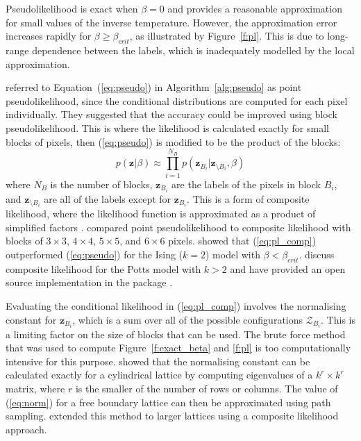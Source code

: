 \documentclass[nojss,shortnames]{jss}\usepackage[]{graphicx}\usepackage[]{color}
\begin{document}
Pseudolikelihood is exact when $\beta=0$ and provides a reasonable approximation for small values of the inverse temperature. However, the approximation error increases rapidly for $\beta \ge \beta_{crit}$, as illustrated by Figure~\ref{f:pl}. This is due to long-range dependence between the labels, which is inadequately modelled by the local approximation.

\citet{Ryden1998} referred to Equation~(\ref{eq:pseudo}) in Algorithm~\ref{alg:pseudo} as point pseudolikelihood, since the conditional distributions are computed for each pixel individually. They suggested that the accuracy could be improved using block pseudolikelihood. This is where the likelihood is calculated exactly for small blocks of pixels, then (\ref{eq:pseudo}) is modified to be the product of the blocks:
\begin{equation}
p(\mathbf{z}|\beta) \approx \prod_{i=1}^{N_B} p(\mathbf{z}_{B_i} | \mathbf{z}_{\setminus B_i}, \beta)
\label{eq:pl_comp}
\end{equation}
where $N_B$ is the number of blocks, $\mathbf{z}_{B_i}$ are the labels of the pixels in block $B_i$, and $\mathbf{z}_{\setminus B_i}$ are all of the labels except for $\mathbf{z}_{B_i}$. This is a form of composite likelihood, where the likelihood function is approximated as a product of simplified factors \citep{Varin2011}. \citet{Friel2012} compared point pseudolikelihood to composite likelihood with blocks of $3 \times 3$, $4 \times 4$, $5 \times 5$, and $6 \times 6$ pixels. \citeauthor{Friel2012} showed that (\ref{eq:pl_comp}) outperformed (\ref{eq:pseudo}) for the Ising ($k=2$) model with $\beta < \beta_{crit}$. \citet{Okabayashi2011} discuss composite likelihood for the Potts model with $k > 2$ and have provided an open source implementation in the  package  \citep{Geyer2014}.

Evaluating the conditional likelihood in (\ref{eq:pl_comp}) involves the normalising constant for $\mathbf{z}_{B_i}$, which is a sum over all of the possible configurations $\mathcal{Z}_{B_i}$. This is a limiting factor on the size of blocks that can be used. The brute force method that was used to compute Figure~\ref{f:exact_beta} and \ref{f:pl} is too computationally intensive for this purpose. \citet{Pettitt2003} showed that the normalising constant can be calculated exactly for a cylindrical lattice by computing eigenvalues of a $k^r \times k^r$ matrix, where $r$ is the smaller of the number of rows or columns. The value of (\ref{eq:norm}) for a free boundary lattice can then be approximated using path sampling. \citet{Friel2004} extended this method to larger lattices using a composite likelihood approach.
\end{document}
